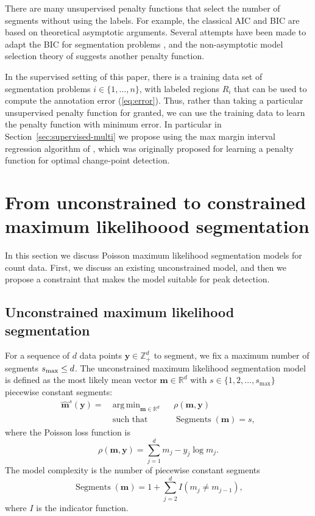 \documentclass{article}
\DeclareMathOperator*{\argmin}{arg\,min}
\DeclareMathOperator*{\Segments}{Segments}
\newcommand{\ZZ}{\mathbb Z}
\newcommand{\RR}{\mathbb R}
\begin{document}
There are many unsupervised penalty functions that select the number
of segments without using the labels. For example, the classical AIC
\citep{Akaike73} and BIC \citep{Schwarz78} are based on theoretical
asymptotic arguments. Several attempts have been made to adapt the BIC
for segmentation problems \citep{Yao88, mBIC}, and the non-asymptotic
model selection theory of \citet{cleynen2013segmentation} suggests
another penalty function.

In the supervised setting of this paper, there is a training data set
of segmentation problems $i\in\{1, \dots, n\}$, with labeled regions
$R_i$ that can be used to compute the annotation error
(\ref{eq:error}). Thus, rather than taking a particular unsupervised
penalty function for granted, we can use the training data to learn
the penalty function with minimum error. In particular in
Section~\ref{sec:supervised-multi} we propose using the max margin interval
regression algorithm of \citet{HOCKING-penalties}, which was
originally proposed for learning a penalty function for optimal
change-point detection.

\section{From unconstrained to constrained maximum likelihoood
  segmentation}
\label{sec:model}

In this section we discuss Poisson maximum likelihood segmentation
models for count data. First, we discuss an existing unconstrained
model, and then we propose a constraint that makes the model suitable
for peak detection.

\subsection{Unconstrained maximum likelihood segmentation}

For a sequence of $d$ data points $\mathbf y\in\ZZ_+^d$ to segment, we
fix a maximum number of segments $ s_{\text{\text{max}}}\leq d$. The
unconstrained maximum likelihood segmentation model is defined as the
most likely mean vector $\mathbf m\in\RR^d$ with $s\in\{1, 2, \dots,
s_{\max}\}$ piecewise constant segments:
\begin{align}
  \label{unconstrained}
  \mathbf{\hat m}^s(\mathbf y)  =\ 
  &\argmin_{\mathbf m\in\RR^{d}} && 
  \rho
  (\mathbf m, \mathbf y) \\
  &\text{such that} && \Segments(\mathbf m)=s,
  \nonumber
\end{align}
where the Poisson loss function is
\begin{equation}\label{eq:rho}
  \rho(\mathbf m, \mathbf y)= \sum_{j=1}^d m_j - y_j \log m_j.
\end{equation} 
The model complexity is the number of piecewise constant segments
\begin{equation}
  \Segments(\mathbf m)=1+\sum_{j=2}^d I(m_j \neq m_{j-1}),
\end{equation}
where $I$ is the indicator function. 
\end{document}
